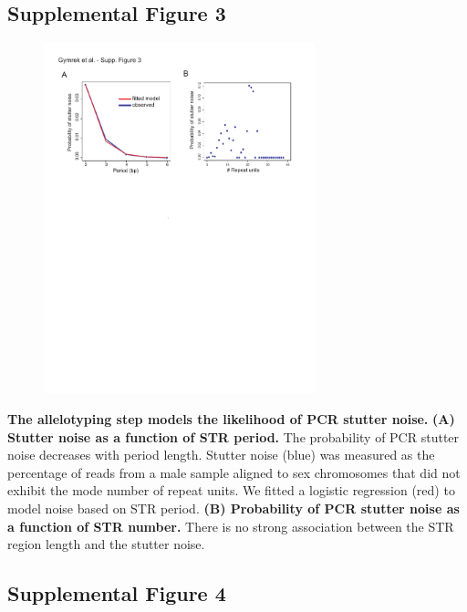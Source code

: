 {\pagebreak
\subsection{Supplemental Figure 3}

\begin{figure}[h!]
\centering
\label{fig:lobsup3}
\includegraphics[width=0.7\textwidth]{Figures/Chapter2/SuppFig3.pdf}
\end{figure}
\textbf{The allelotyping step models the likelihood of PCR stutter noise.} \textbf{(A) Stutter noise as a function of STR period.} The probability of PCR stutter noise decreases with period length. Stutter noise (blue) was measured as the percentage of reads from a male sample aligned to sex chromosomes that did not exhibit the mode number of repeat units. We fitted a logistic regression (red) to model noise based on STR period. \textbf{(B) Probability of PCR stutter noise as a function of STR number.} There is no strong association between the STR region length and the stutter noise. 

\pagebreak
\subsection{Supplemental Figure 4}

}
